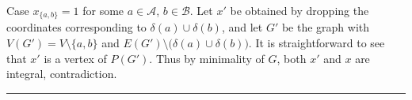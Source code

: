 \documentclass[preprint]{elsarticle}
\newenvironment{proof}{{\bf Proof:  }}{\hfill\rule{2mm}{2mm}}
\begin{document}
\begin{proof}
Case $x_{\{a,b\}}=1$ for some $a\in \mathcal{A}$, $b\in\mathcal{B}$. Let $x'$ be obtained by dropping the coordinates corresponding to $\delta(a)\cup\delta(b)$, and let $G'$ be the graph with $V(G')=V\setminus\{a,b\}$ and $E(G')\setminus \big(\delta(a)\cup\delta(b)\big)$. It is straightforward to see that $x'$ is a vertex of $P(G')$. Thus by minimality of $G$, both $x'$ and $x$ are integral, contradiction. 
\end{proof}




\end{document}
